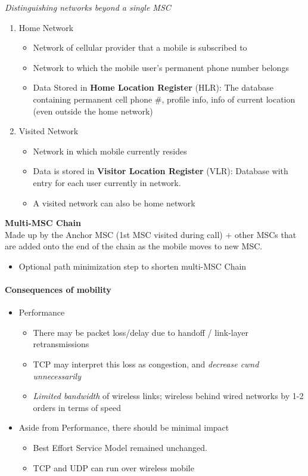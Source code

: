 \documentclass[a4paper]{article}
\begin{document}
\medskip
\noindent\textit{Distinguishing networks beyond a single MSC}
\begin{enumerate}
    \item Home Network
    \begin{itemize}[label=$\circ$]
        \item Network of cellular provider that a mobile is subscribed to
        \item Network to which the mobile user's permanent phone number belongs
        \item Data Stored in \textbf{Home Location Register} (HLR): The database containing permanent cell phone \#, profile info, info of current location (even outside the home network)
    \end{itemize}
    \newpage
    \item Visited Network
    \begin{itemize}[label=$\circ$]
        \item Network in which mobile currently resides
        \item Data is stored in \textbf{Visitor Location Register} (VLR): Database with entry for each user currently in network.
        \item A visited network can also be home network
    \end{itemize}
\end{enumerate}

\medskip
\noindent\textbf{Multi-MSC Chain}\\
Made up by the Anchor MSC (1st MSC visited during call) + other MSCs that are added onto the end of the chain as the mobile moves to new MSC.
\begin{itemize}
    \item Optional path minimization step to shorten multi-MSC Chain
\end{itemize}

\paragraph{Consequences of mobility}\mbox{}
\begin{itemize}
    \item Performance
    \begin{itemize}[label=$\circ$]
        \item There may be packet loss/delay due to handoff / link-layer retransmissions
        \item TCP may interpret this loss as congestion, and \textit{decrease cwnd unnecessarily}
        \item \textit{Limited bandwidth} of wireless links; wireless behind wired networks by 1-2 orders in terms of speed
    \end{itemize}
    \item Aside from Performance, there should be minimal impact
    \begin{itemize}[label=$\circ$]
        \item Best Effort Service Model remained unchanged.
        \item TCP and UDP can run over wireless mobile
    \end{itemize}
\end{itemize}
\end{document}
